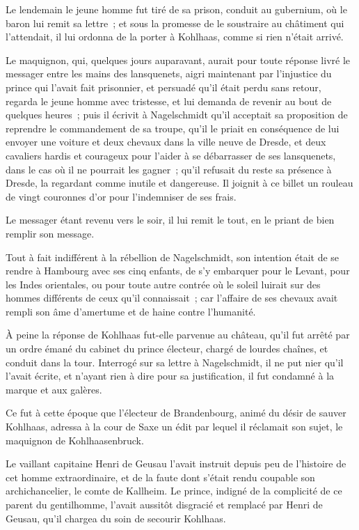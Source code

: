 \documentclass[french,twoside]{book} %
\begin{document}
Le lendemain le jeune homme fut tiré de sa prison, conduit au gubernium, où le baron lui remit sa lettre ; et sous la promesse de le soustraire au châtiment qui l’attendait, il lui ordonna de la porter à Kohlhaas, comme si rien n’était arrivé.\par
Le maquignon, qui, quelques jours auparavant, aurait pour toute réponse livré le messager entre les mains des lansquenets, aigri maintenant par l’injustice du prince qui l’avait fait prisonnier, et persuadé qu’il était perdu sans retour, regarda le jeune homme avec tristesse, et lui demanda de revenir au bout de quelques heures ; puis il écrivit à Nagelschmidt qu’il acceptait sa proposition de reprendre le commandement de sa troupe, qu’il le priait en conséquence de lui envoyer une voiture et deux chevaux dans la ville neuve de Dresde, et deux cavaliers hardis et courageux pour l’aider à se débarrasser de ses lansquenets, dans le cas où il ne pourrait les gagner ; qu’il refusait du reste sa présence à Dresde, la regardant comme inutile et dangereuse. Il joignit à ce billet un rouleau de vingt couronnes d’or pour l’indemniser de ses frais.\par
Le messager étant revenu vers le soir, il lui remit le tout, en le priant de bien remplir son message.\par
Tout à fait indifférent à la rébellion de Nagelschmidt, son intention était de se rendre à Hambourg avec ses cinq enfants, de s’y embarquer pour le Levant, pour les Indes orientales, ou pour toute autre contrée où le soleil luirait sur des hommes différents de ceux qu’il connaissait ; car l’affaire de ses chevaux avait rempli son âme d’amertume et de haine contre l’humanité.\par
À peine la réponse de Kohlhaas fut-elle parvenue au château, qu’il fut arrêté par un ordre émané du cabinet du prince électeur, chargé de lourdes chaînes, et conduit dans la tour. Interrogé sur sa lettre à Nagelschmidt, il ne put nier qu’il l’avait écrite, et n’ayant rien à dire pour sa justification, il fut condamné à la marque et aux galères.\par
Ce fut à cette époque que l’électeur de Brandenbourg, animé du désir de sauver Kohlhaas, adressa à la cour de Saxe un édit par lequel il réclamait son sujet, le maquignon de Kohlhaasenbruck.\par
Le vaillant capitaine Henri de Geusau l’avait instruit depuis peu de l’histoire de cet homme extraordinaire, et de la faute dont s’était rendu coupable son archichancelier, le comte de Kallheim. Le prince, indigné de la complicité de ce parent du gentilhomme, l’avait aussitôt disgracié et remplacé par Henri de Geusau, qu’il chargea du soin de secourir Kohlhaas.\par
\end{document}
